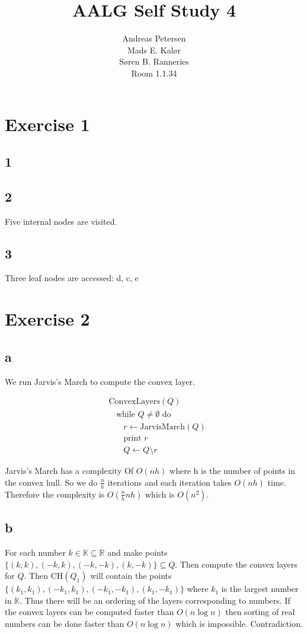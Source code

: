 \documentclass[koma,a4paper]{article}
\title{AALG Self Study 4}
\author{Andreas Petersen\\
Mads E. Kalør\\
Søren B. Ranneries\\
Room 1.1.34}
\begin{document}
\maketitle

\pagebreak

\section{Exercise 1}

\subsection{1}


\subsection{2}
Five internal nodes are visited.

\subsection{3}
Three leaf nodes are accessed: d, c, e

\section{Exercise 2}
\subsection{a}
We run Jarvis's March to compute the convex layer.

\begin{align*}
  &\text{ConvexLayers}(Q)\\
  &~~~~\text{while } Q \neq \emptyset \text{ do }\\
  &~~~~~~~~r \leftarrow \text{JarvisMarch}(Q)\\
  &~~~~~~~~\text{print } r\\
  &~~~~~~~~Q \leftarrow Q \setminus r
\end{align*}

Jarvis's March has a complexity Of $O(nh)$ where h is the number of points in the convex hull. So we do $\frac{n}{h}$ iterations and each iteration takes $O(nh)$ time. Therefore the complexity is $O\left(\frac{n}{h}nh\right)$ which is $O\left(n^2\right)$.

\subsection{b}
For each number $k \in \mathbb{K} \subseteq \mathbb{R}$ and make points $\{(k, k), (-k, k), (-k, -k), (k, -k)\} \subseteq Q$. Then compute the convex layers for $Q$. Then $\text{CH}(Q_1)$ will contain the points $\{(k_1, k_1), (-k_1, k_1), (-k_1, -k_1), (k_1, -k_1)\}$ where $k_1$ is the largest number in $\mathbb{K}$. Thus there will be an ordering of the layers corresponding to numbers. If the convex layers can be computed faster than $O(n\log n)$ then sorting of real numbers can be done faster than $O(n\log n)$ which is impossible. Contradiction.
\end{document}
